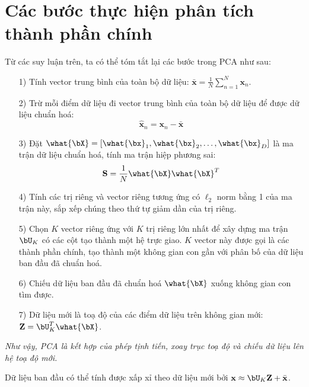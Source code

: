 \section{Các bước thực hiện phân tích thành phần chính}
Từ các suy luận trên, ta có thể tóm tắt lại các bước trong PCA như sau:
\begin{itemize}
    \item[1)] Tính vector trung bình của toàn bộ dữ liệu:
          \begin{math}
              \bar{\mathbf{x}} = \frac{1}{N} \sum_{n=1}^N \mathbf{x}_n
          \end{math}.
    \item[2)] Trừ mỗi điểm dữ liệu đi vector trung bình của toàn bộ dữ liệu để được dữ
          liệu chuẩn hoá:
          \begin{equation}
              \hat{\mathbf{x}}_n = \mathbf{x}_n - \bar{\mathbf{x}}
          \end{equation}
    \item[3)] Đặt $\what{\bX} = [\what{\bx}_1, \what{\bx}_2, \dots,
              \what{\bx}_D]$ là ma trận dữ liệu chuẩn hoá, tính ma trận hiệp phương sai:
          \begin{equation}
              \mathbf{S} = \frac{1}{N}\what{\bX}\what{\bX}^T
          \end{equation}
    \item[4)] Tính các trị riêng và vector riêng tương ứng có $\ell_2$ norm bằng 1
          của ma trận này, sắp xếp chúng theo thứ tự giảm dần của trị riêng.
    \item[5)] Chọn $K$ vector riêng ứng với $K$ trị riêng lớn nhất để xây dựng ma trận $\bU_K$ có các cột tạo thành một hệ trực giao. $K$ vector này được gọi là các thành phần chính, tạo thành một không gian con {gần} với phân bố của dữ liệu ban đầu đã chuẩn hoá.
    \item[6)] Chiếu dữ liệu ban đầu đã chuẩn hoá $\what{\bX}$ xuống không gian con tìm được.
    \item[7)] Dữ liệu mới là toạ độ của các điểm dữ liệu trên không gian mới:
          \begin{math}
              \mathbf{Z} = \bU_K^T\what{\bX}
          \end{math}.
\end{itemize}

\textit{Như vậy, PCA là kết hợp của phép tịnh tiến, xoay trục toạ độ và chiếu dữ liệu lên hệ toạ độ mới.}

Dữ liệu ban đầu có thể tính được xấp xỉ theo dữ liệu mới bởi
\begin{math}
    \mathbf{x} \approx \bU_K\mathbf{Z} + \bar{\mathbf{x}}
\end{math}.

